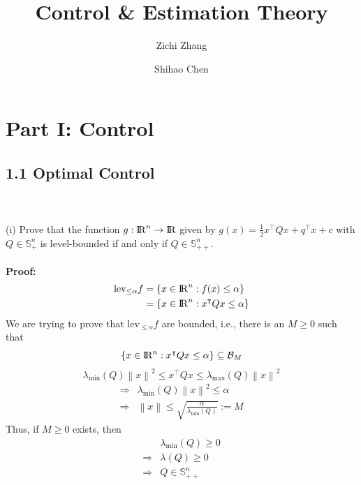 \documentclass[a4paper,11pt,reqno]{amsart}
\title[ELE8088 Coursework]{Control \& Estimation Theory}
\author[Z. Zhang]{Zichi Zhang}
\author[S. Chen]{Shihao Chen}
\newcommand{\R}{{\rm I\!R}}
\newcommand{\tran}{\intercal}
\begin{document}
\maketitle



\section{Part I: Control}


\subsection*{1.1 Optimal Control}\label{sec:q1}
\
\\ \\
(i) Prove that the function $g:\R^n\to \R$ given by $g(x) = \frac{1}{2}x^{\tran}Qx+q^{\tran}x+c$ with $Q\in \mathbb{S}^n_+$ is level-bounded
if and only if $Q\in \mathbb{S}^n_{++}$.
\\ \\
\textbf{Proof:}
\begin{align}
    \mathrm{lev}_{\leq \alpha}f&=\{x\in\R^n:f(x)\leq\alpha\}\notag\\
    &=\{x\in\R^n:x^{\tran}Qx\leq\alpha\}
\end{align}
We are trying to prove that $\mathrm{lev}_{\leq \alpha}f$ are bounded, i.e., there is an $M\geq 0$ such that
\begin{equation}
    \{x\in\R^n:x^{\tran}Qx\leq\alpha\}\subseteq \mathcal{B}_M
\end{equation}
\begin{equation}
    \lambda_{\mathrm{min}}(Q)\left\lVert x\right\rVert ^2\leq x^{\tran}Qx\leq \lambda_{\mathrm{max}}(Q)\left\lVert x\right\rVert ^2
\end{equation}
\begin{align}
    \Longrightarrow &\lambda_{\mathrm{min}}(Q)\left\lVert x\right\rVert ^2\leq \alpha\\
    \Longrightarrow &\left\lVert x\right\rVert \leq \sqrt{\frac{\alpha}{\lambda_{\mathrm{min}}(Q)}}:=M
\end{align}
Thus, if $M\geq 0$ exists, then
\begin{align}
    &\lambda_{\mathrm{min}}(Q)\geq 0\\
    \Longrightarrow&\lambda(Q)\geq 0\\
    \Longrightarrow &Q\in \mathbb{S}^n_{++}
\end{align}
\end{document}
